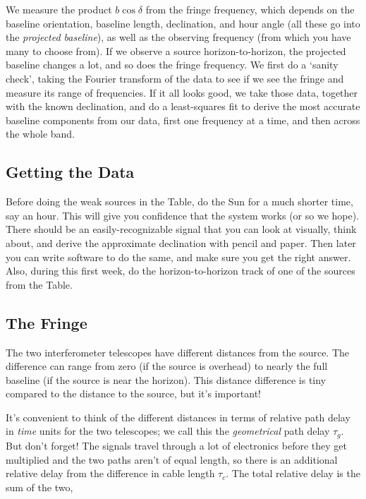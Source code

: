 \documentclass[11pt,preprint]{aastex}
\begin{document}
\noindent
We measure the product $b \cos \delta$ from the fringe frequency, which
depends on the baseline orientation, baseline length, declination, and
hour angle (all these go into the {\it projected baseline}), as well
as the observing frequency (from which you have many to choose from). If we
observe a source horizon-to-horizon, the projected baseline changes a
lot, and so does the fringe frequency. We first do a `sanity check',
taking the Fourier transform of the data to see if we see the fringe and
measure its range of frequencies. If it all looks good, we take those
data, together with the known declination, and do a least-squares fit to
derive the most accurate baseline components
from our data, first one frequency at a time, and then across the whole band.

\subsection{Getting the Data}

\noindent
	Before doing the weak sources in the Table, do
the Sun for a much shorter time, say an hour. This will give you
confidence that the system works (or so we hope). There should be an
easily-recognizable signal that you can look at visually, think about,
and derive the approximate declination with pencil and paper. Then later
you can write software to do the same, and make sure you get the right
answer.  Also, during this first week, do the horizon-to-horizon track
of one of the sources from the Table.

\subsection{The Fringe} \label{details}

\noindent
	The two interferometer telescopes have different distances from
the source. The difference can range from zero (if the source is
overhead) to nearly the full baseline (if the source is near the
horizon). This distance difference is tiny compared to the distance to
the source, but it's important! 

	It's convenient to think of the different distances in terms of 
relative path delay in {\it time} units for the two telescopes; we call
this the {\it geometrical} path delay $\tau_g$.  But don't forget! The
signals travel through a lot of electronics before they get multiplied
and the two paths aren't of equal length, so there is an additional
relative delay from the difference in cable length $\tau_c$.  The total
relative delay is the sum of the two,
\end{document}
